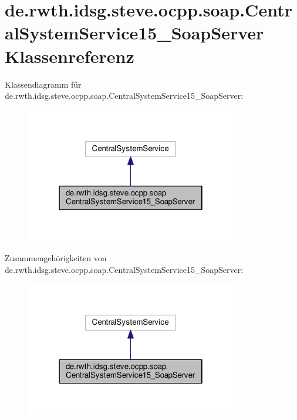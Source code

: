 \hypertarget{classde_1_1rwth_1_1idsg_1_1steve_1_1ocpp_1_1soap_1_1_central_system_service15___soap_server}{\section{de.\-rwth.\-idsg.\-steve.\-ocpp.\-soap.\-Central\-System\-Service15\-\_\-\-Soap\-Server Klassenreferenz}
\label{classde_1_1rwth_1_1idsg_1_1steve_1_1ocpp_1_1soap_1_1_central_system_service15___soap_server}
}


Klassendiagramm für de.\-rwth.\-idsg.\-steve.\-ocpp.\-soap.\-Central\-System\-Service15\-\_\-\-Soap\-Server\-:
\nopagebreak
\begin{figure}[H]
\begin{center}
\leavevmode
\includegraphics[width=262pt]{classde_1_1rwth_1_1idsg_1_1steve_1_1ocpp_1_1soap_1_1_central_system_service15___soap_server__inherit__graph}
\end{center}
\end{figure}


Zusammengehörigkeiten von de.\-rwth.\-idsg.\-steve.\-ocpp.\-soap.\-Central\-System\-Service15\-\_\-\-Soap\-Server\-:
\nopagebreak
\begin{figure}[H]
\begin{center}
\leavevmode
\includegraphics[width=262pt]{classde_1_1rwth_1_1idsg_1_1steve_1_1ocpp_1_1soap_1_1_central_system_service15___soap_server__coll__graph}
\end{center}
\end{figure}
